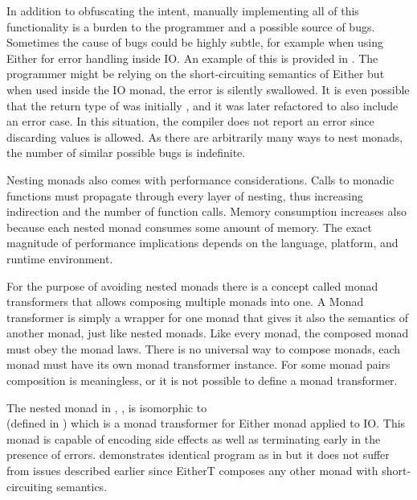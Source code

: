 

In addition to obfuscating the intent, manually implementing all of this functionality is a burden to the programmer and a possible source of bugs. Sometimes the cause of bugs could be highly subtle, for example when using Either for error handling inside IO. An example of this is provided in . The programmer might be relying on the short-circuiting semantics of Either but when used inside the IO monad, the error is silently swallowed. It is even possible that the return type of  was initially , and it was later refactored to also include an error case. In this situation, the compiler does not report an error since discarding values is allowed. As there are arbitrarily many ways to nest monads, the number of similar possible bugs is indefinite.



Nesting monads also comes with performance considerations. Calls to monadic functions must propagate through every layer of nesting, thus increasing indirection and the number of function calls. Memory consumption increases also because each nested monad consumes some amount of memory. The exact magnitude of performance implications depends on the language, platform, and runtime environment.



For the purpose of avoiding nested monads there is a concept called monad transformers that allows composing multiple monads into one. A Monad transformer is simply a wrapper for one monad that gives it also the semantics of another monad, just like nested monads. Like every monad, the composed monad must obey the monad laws. There is no universal way to compose monads, each monad must have its own monad transformer instance. For some monad pairs composition is meaningless, or it is not possible to define a monad transformer.

The nested monad in , , is isomorphic to \\ (defined in ) which is a monad transformer for Either monad applied to IO. This monad is capable of encoding side effects as well as terminating early in the presence of errors.  demonstrates identical program as in  but it does not suffer from issues described earlier since EitherT composes any other monad with short-circuiting semantics.

